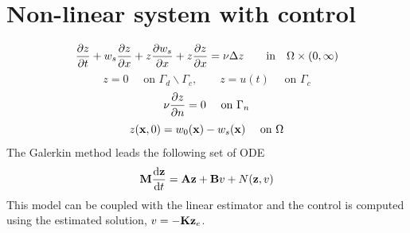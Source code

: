 \documentclass[12pt]{article}
\begin{document}
\section{Non-linear system with control}
\begin{equation*}
\frac{\partial z}{\partial t} + w_s \frac{\partial z}{\partial x} + z \frac{\partial w_s}{\partial x} + z \frac{\partial z}{\partial x} = \nu \Delta z \qquad \mbox{in} \quad \Omega \times (0,\infty)
\end{equation*}
\begin{equation*}
z = 0 \quad \text{ on } \Gamma_d \backslash \Gamma_c, \qquad z = u(t) \quad \text{ on } \Gamma_c
\end{equation*}
\begin{equation*}
\nu \frac{\partial z}{\partial n} = 0 \quad \text{ on } \Gamma_n 
\end{equation*}
\begin{equation*}
z({\mathbf x},0) = w_0({\mathbf x}) - w_s({\mathbf x}) \quad \text{ on } \Omega
\end{equation*}
The Galerkin method leads the following set of ODE
\[
{\mathbf M} \frac{\textrm{d} {\mathbf z}}{\textrm{d} t} = {\mathbf A} {\mathbf z} + {\mathbf B} v + N({\mathbf z},v)
\]
This model can be coupled with the linear estimator and the control is computed using the estimated solution, $v = -{\mathbf K} {\mathbf z}_e$.









\end{document}
